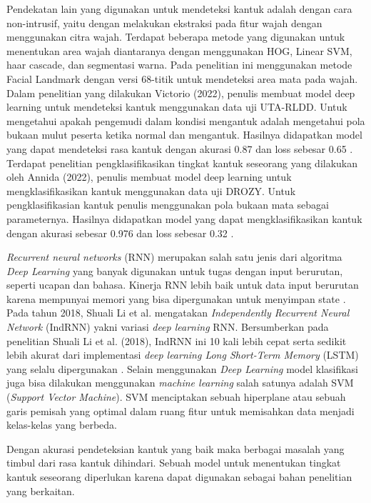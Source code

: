 Pendekatan lain yang digunakan untuk mendeteksi kantuk adalah dengan cara non-intrusif,
yaitu dengan melakukan ekstraksi pada fitur wajah dengan menggunakan citra wajah.
Terdapat beberapa metode yang digunakan untuk menentukan area wajah diantaranya dengan
menggunakan HOG, Linear SVM, haar cascade, dan segmentasi warna. Pada penelitian ini
menggunakan metode Facial Landmark dengan versi 68-titik untuk mendeteksi area mata pada
wajah. Dalam penelitian yang dilakukan Victorio (2022), penulis membuat model deep
learning untuk mendeteksi kantuk menggunakan data uji UTA-RLDD. Untuk mengetahui apakah
pengemudi dalam kondisi mengantuk adalah mengetahui pola bukaan mulut peserta ketika
normal dan mengantuk. Hasilnya didapatkan model yang dapat mendeteksi rasa kantuk dengan
akurasi 0.87 dan loss sebesar 0.65 \parencite{10}. Terdapat penelitian pengklasifikasikan tingkat kantuk
seseorang yang  dilakukan oleh Annida (2022), penulis membuat model deep learning untuk
mengklasifikasikan kantuk menggunakan data uji DROZY. Untuk pengklasifikasian kantuk
penulis menggunakan pola bukaan mata sebagai parameternya. Hasilnya didapatkan model
yang dapat mengklasifikasikan kantuk dengan akurasi sebesar 0.976 dan loss sebesar 0.32
\parencite{11}.

\emph{Recurrent neural networks} (RNN) merupakan salah satu jenis
dari algoritma \emph{Deep Learning} yang banyak digunakan untuk tugas
dengan input berurutan, seperti ucapan dan bahasa. Kinerja RNN lebih baik
untuk data input berurutan karena mempunyai memori yang bisa
dipergunakan untuk menyimpan state \parencite{18}. Pada tahun 2018,
Shuali Li et al. mengatakan \emph{Independently Recurrent Neural Network}
(IndRNN) yakni variasi \emph{deep learning} RNN. Bersumberkan pada
penelitian Shuali Li et al. (2018), IndRNN ini 10 kali lebih cepat
serta sedikit lebih akurat dari implementasi \emph{deep learning Long Short-Term Memory}
(LSTM) yang selalu dipergunakan \parencite{8}. Selain menggunakan \emph{Deep Learning}
model klasifikasi juga bisa dilakukan menggunakan \emph{machine learning} salah satunya
adalah SVM (\emph{Support Vector Machine}). SVM menciptakan sebuah
hiperplane atau sebuah garis pemisah yang optimal dalam ruang fitur untuk
memisahkan data menjadi kelas-kelas yang berbeda. \parencite{28}

Dengan akurasi pendeteksian kantuk yang baik maka berbagai masalah yang timbul dari
rasa kantuk dihindari. Sebuah model untuk menentukan tingkat kantuk seseorang diperlukan
karena dapat digunakan sebagai bahan penelitian yang berkaitan.

